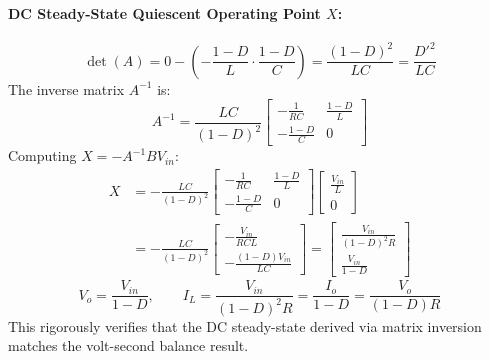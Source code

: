 \paragraph{DC Steady-State Quiescent Operating Point $X$:}
\begin{equation}
\det(A) = 0 - \left( -\frac{1-D}{L} \cdot \frac{1-D}{C} \right) = \frac{(1-D)^2}{LC} = \frac{{D'}^2}{LC}
\end{equation}
The inverse matrix $A^{-1}$ is:
\begin{equation}
A^{-1} = \frac{LC}{(1-D)^2} \begin{bmatrix} -\frac{1}{RC} & \frac{1-D}{L} \\ -\frac{1-D}{C} & 0 \end{bmatrix}
\end{equation}
Computing $X = -A^{-1} B V_{in}$:
\begin{equation}
\begin{aligned}
X &= -\frac{LC}{(1-D)^2} \begin{bmatrix} -\frac{1}{RC} & \frac{1-D}{L} \\ -\frac{1-D}{C} & 0 \end{bmatrix} \begin{bmatrix} \frac{V_{in}}{L} \\ 0 \end{bmatrix} \\
&= -\frac{LC}{(1-D)^2} \begin{bmatrix} -\frac{V_{in}}{RCL} \\ -\frac{(1-D)V_{in}}{LC} \end{bmatrix} = \begin{bmatrix} \frac{V_{in}}{(1-D)^2 R} \\ \frac{V_{in}}{1-D} \end{bmatrix}
\end{aligned}
\end{equation}
\begin{equation}
\boxed{V_o = \frac{V_{in}}{1-D}, \qquad I_L = \frac{V_{in}}{(1-D)^2 R} = \frac{I_o}{1-D} = \frac{V_o}{(1-D)R}}
\end{equation}
This rigorously verifies that the DC steady-state derived via matrix inversion matches the volt-second balance result.

